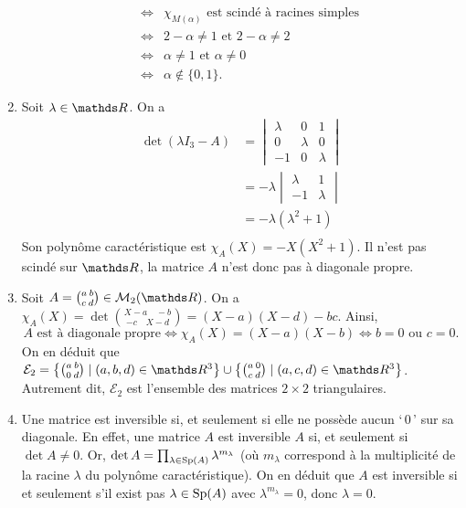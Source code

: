 \documentclass[a4paper]{article}
\begin{document}
\begin{enumerate}
\begin{enumerate}
\begin{align*}
						\iff& \chi_{M(\alpha)} \text{ est scindé à racines simples }\\
						\iff& 2 - \alpha \neq 1 \text{ et } 2 - \alpha \neq  2\\
						\iff& \alpha \neq 1 \text{ et } \alpha \neq 0\\
						\iff& \alpha \not\in  \{0,1\}.
					\end{align*}
			\end{enumerate}
		\item Soit $\lambda \in \R$. On a
			\begin{align*}
				\det(\lambda I_3 - A) &= 
				\begin{vmatrix}
					\lambda & 0 & 1\\
					0 & \lambda & 0\\
					-1 & 0 & \lambda
				\end{vmatrix}\\
				&= -\lambda
				\begin{vmatrix}
					\lambda & 1\\
					-1 & \lambda
				\end{vmatrix}\\
				&= -\lambda(\lambda^2 + 1) \\
			\end{align*}
			Son polynôme caractéristique est $\chi_A(X) = -X(X^2 + 1)$. Il n'est pas scindé sur $\R$, la matrice $A$\/ n'est donc pas à diagonale propre.
		\item Soit $A = {a\:b\choose c\:d} \in \mathcal{M}_2(\R)$. On a $\chi_A(X) = \det{X - a\quad-b\choose-c\quad X - d} = (X - a)(X-d) - bc$. Ainsi, \[
				A \text{ est à diagonale propre} \iff \chi_A(X) = (X-a)(X-b) \iff b = 0 \text{ ou } c = 0
			.\] On en déduit que $\mathcal{E}_2 = \big\{ {a\:b\choose0\:d}  \mid (a,b,d) \in \R^3 \big\} \cup \big\{ {a\:0\choose c\:d}  \mid (a,c,d) \in \R^3 \big\}$. Autrement dit, $\mathcal{E}_2$\/ est l'ensemble des matrices $2\times 2$\/ triangulaires.
		\item Une matrice est inversible si, et seulement si elle ne possède aucun `\,0\,' sur sa diagonale. En effet, une matrice $A$\/ est inversible $A$\/ si, et seulement si $\det A \neq 0$. Or, $\operatorname{det} A = \prod_{\lambda \in \operatorname{Sp}(A)} \lambda^{m_\lambda}$\/ (où $m_\lambda$\/ correspond à la multiplicité de la racine $\lambda$\/ du polynôme caractéristique). On en déduit que $A$ est inversible si et seulement s'il exist pas $\lambda \in \operatorname{Sp}(A)$\/ avec $\lambda^{m_\lambda} = 0$, donc $\lambda = 0$.


\end{enumerate}
\end{document}
